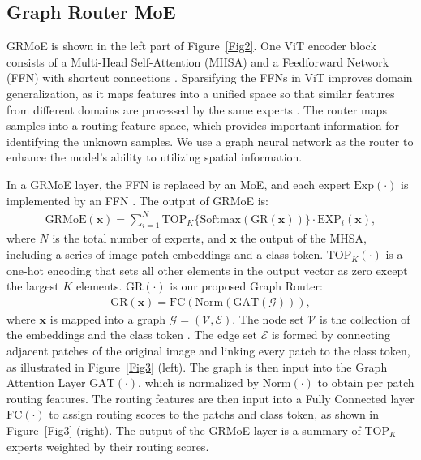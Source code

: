 \documentclass[10pt,twocolumn,letterpaper]{article}
\begin{document}
\subsection{Graph Router MoE} \label{sec:graph_router}

GRMoE is shown in the left part of Figure~\ref{Fig2}. One ViT encoder block consists of a Multi-Head Self-Attention (MHSA) and a Feedforward Network (FFN) with shortcut connections \cite{dosovitskiy2021an}. Sparsifying the FFNs in ViT improves domain generalization, as it maps features into a unified space so that similar features from different domains are processed by the same experts \cite{li2023sparse}. The router maps samples into a routing feature space, which provides important information for identifying the unknown samples. We use a graph neural network \cite{kipf2017semisupervised, veli2018graph, Fey2019wv} as the router to enhance the model's ability to utilizing spatial information.

In a GRMoE layer, the FFN is replaced by an MoE, and each expert $\text{Exp}(\cdot)$ is implemented by an FFN \cite{riquelme2021scaling, li2023sparse}. The output of GRMoE is:
\begin{align}\label{eq:moe1}
    \text{GRMoE}(\bm{x}) = \sum_{i=1}^N \text{TOP}_K \{ \text{Softmax}(\text{GR}(\bm{x})) \} \cdot \text{EXP}_i (\bm{x}),
\end{align}
where $N$ is the total number of experts, and $\bm{x}$ the output of the MHSA, including a series of image patch embeddings and a class token. $\text{TOP}_K(\cdot)$ is a one-hot encoding that sets all other elements in the output vector as zero except the largest $K$ elements. $\text{GR}(\cdot)$ is our proposed Graph Router:
\begin{align}\label{eq:moe}
    \text{GR}(\bm{x})=\text{FC} ( \text{Norm} (\text{GAT} (\mathcal{G}))),
\end{align}
where $\bm{x}$ is mapped into a graph $\mathcal{G} =(\mathcal{V}, \mathcal{E})$. The node set $\mathcal{V}$ is the collection of the embeddings and the class token \cite{han2022vision}. The edge set $\mathcal{E}$ is formed by connecting adjacent patches of the original image and linking every patch to the class token, as illustrated in Figure~\ref{Fig3} (left). The graph is then input into the Graph Attention Layer \cite{veli2018graph} $\text{GAT}(\cdot)$, which is normalized by $\text{Norm} (\cdot)$ to obtain per patch routing features. The routing features are then input into a Fully Connected layer $\text{FC}(\cdot)$ to assign routing scores to the patchs and class token, as shown in Figure~\ref{Fig3} (right). The output of the GRMoE layer is a summary of $\text{TOP}_K$ experts weighted by their routing scores.
\end{document}
